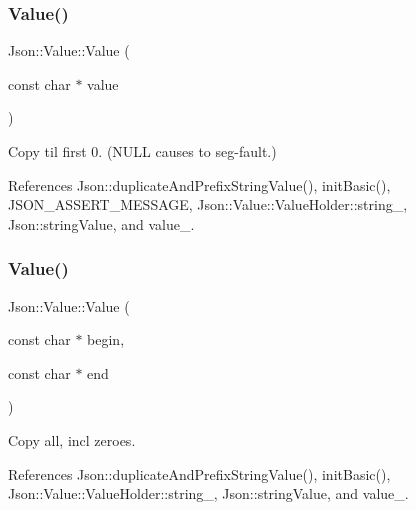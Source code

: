 \subsubsection{\texorpdfstring{Value()}{Value()}\hspace{0.1cm}{\footnotesize\ttfamily [7/12]}}
{\footnotesize\ttfamily Json\+::\+Value\+::\+Value (\begin{DoxyParamCaption}\item[{const char $\ast$}]{value }\end{DoxyParamCaption})}



Copy til first 0. (N\+U\+LL causes to seg-\/fault.) 



References Json\+::duplicate\+And\+Prefix\+String\+Value(), init\+Basic(), J\+S\+O\+N\+\_\+\+A\+S\+S\+E\+R\+T\+\_\+\+M\+E\+S\+S\+A\+GE, Json\+::\+Value\+::\+Value\+Holder\+::string\+\_\+, Json\+::string\+Value, and value\+\_\+.

\mbox{\label{classJson_1_1Value_a39fa09d1902efbd4350e1236db920571_a39fa09d1902efbd4350e1236db920571}} 
\subsubsection{\texorpdfstring{Value()}{Value()}\hspace{0.1cm}{\footnotesize\ttfamily [8/12]}}
{\footnotesize\ttfamily Json\+::\+Value\+::\+Value (\begin{DoxyParamCaption}\item[{const char $\ast$}]{begin,  }\item[{const char $\ast$}]{end }\end{DoxyParamCaption})}



Copy all, incl zeroes. 



References Json\+::duplicate\+And\+Prefix\+String\+Value(), init\+Basic(), Json\+::\+Value\+::\+Value\+Holder\+::string\+\_\+, Json\+::string\+Value, and value\+\_\+.

\mbox{\label{classJson_1_1Value_a081830e95f88a37054da7e46c65b0766_a081830e95f88a37054da7e46c65b0766}} 

